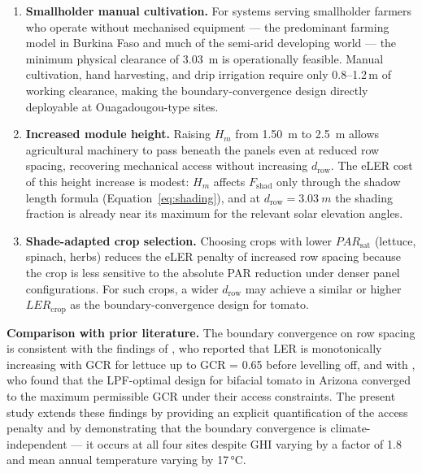 \begin{enumerate}[leftmargin=*, noitemsep]
	
	\item \textbf{Smallholder manual cultivation.} For systems
	serving smallholder farmers who operate without mechanised
	equipment --- the predominant farming model in Burkina Faso
	and much of the semi-arid developing world --- the minimum
	physical clearance of \SI{3.03}{m} is operationally feasible.
	Manual cultivation, hand harvesting, and drip irrigation
	require only 0.8--1.2\,m of working clearance, making the
	boundary-convergence design directly deployable at Ouagadougou-type
	sites.
	
	\item \textbf{Increased module height.} Raising $H_m$ from
	\SI{1.50}{m} to \SI{2.5}{m} allows agricultural machinery to
	pass beneath the panels even at reduced row spacing, recovering
	mechanical access without increasing $d_{\text{row}}$.
	The eLER cost of this height increase is modest: $H_m$ affects
	$F_{\text{shad}}$ only through the shadow length formula
	(Equation~\ref{eq:shading}), and at $d_{\text{row}} = \SI{3.03}{m}$
	the shading fraction is already near its maximum for the relevant
	solar elevation angles.
	
	\item \textbf{Shade-adapted crop selection.} Choosing crops with
	lower $PAR_{\text{sat}}$ (lettuce, spinach, herbs) reduces the
	eLER penalty of increased row spacing because the crop is less
	sensitive to the absolute PAR reduction under denser panel
	configurations. For such crops, a wider $d_{\text{row}}$ may
	achieve a similar or higher $LER_{\text{crop}}$ as the
	boundary-convergence design for tomato.
	
\end{enumerate}

\textbf{Comparison with prior literature.} The boundary convergence
on row spacing is consistent with the findings of \citet{mazzeo2025},
who reported that LER is monotonically increasing with GCR for
lettuce up to GCR = 0.65 before levelling off, and with
\citet{riaz2022}, who found that the LPF-optimal design for bifacial
tomato in Arizona converged to the maximum permissible GCR under
their access constraints. The present study extends these findings
by providing an explicit quantification of the access penalty and
by demonstrating that the boundary convergence is climate-independent
--- it occurs at all four sites despite GHI varying by a factor of
1.8 and mean annual temperature varying by 17\,\si{\celsius}.

